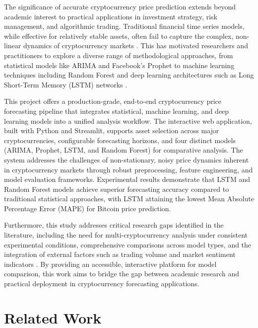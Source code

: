 \documentclass[conference]{IEEEtran}
\begin{document}
The significance of accurate cryptocurrency price prediction extends beyond academic interest to practical applications in investment strategy, risk management, and algorithmic trading. Traditional financial time series models, while effective for relatively stable assets, often fail to capture the complex, non-linear dynamics of cryptocurrency markets \cite{mcnally2018, catania2019}. This has motivated researchers and practitioners to explore a diverse range of methodological approaches, from statistical models like ARIMA and Facebook's Prophet to machine learning techniques including Random Forest and deep learning architectures such as Long Short-Term Memory (LSTM) networks \cite{chowdhury2020, garcia2023, patel2020}.

This project offers a production-grade, end-to-end cryptocurrency price forecasting pipeline that integrates statistical, machine learning, and deep learning models into a unified analysis workflow. The interactive web application, built with Python and Streamlit, supports asset selection across major cryptocurrencies, configurable forecasting horizons, and four distinct models (ARIMA, Prophet, LSTM, and Random Forest) for comparative analysis. The system addresses the challenges of non-stationary, noisy price dynamics inherent in cryptocurrency markets through robust preprocessing, feature engineering, and model evaluation frameworks. Experimental results demonstrate that LSTM and Random Forest models achieve superior forecasting accuracy compared to traditional statistical approaches, with LSTM attaining the lowest Mean Absolute Percentage Error (MAPE) for Bitcoin price prediction.

Furthermore, this study addresses critical research gaps identified in the literature, including the need for multi-cryptocurrency analysis under consistent experimental conditions, comprehensive comparisons across model types, and the integration of external factors such as trading volume and market sentiment indicators \cite{ren2022, alessandretti2018, jiang2021}. By providing an accessible, interactive platform for model comparison, this work aims to bridge the gap between academic research and practical deployment in cryptocurrency forecasting applications.


\section{Related Work}
\end{document}
